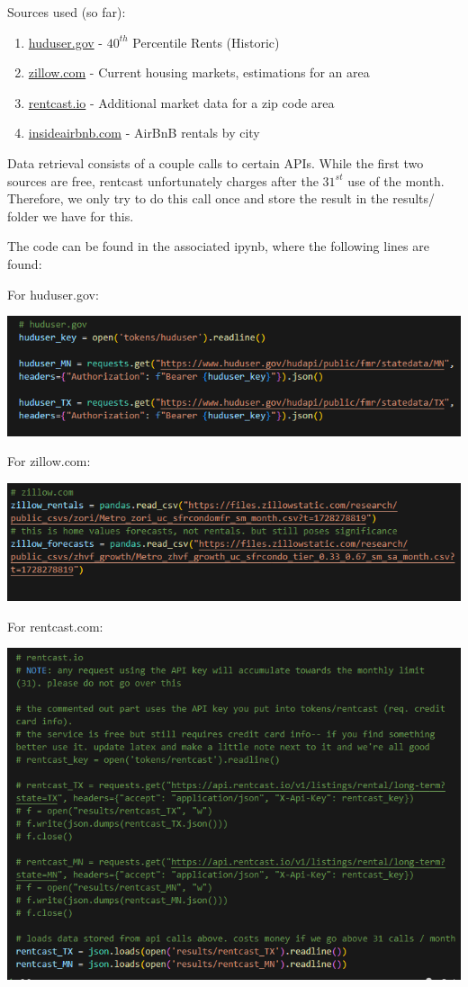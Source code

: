 \documentclass[a4paper]{article}
\begin{document}
\begin{enumerate}
  Sources used (so far):
  \begin{enumerate}
    \item \href{https://www.huduser.gov/portal/datasets/fmr.html#null}{huduser.gov} - $40^{th}$ Percentile Rents (Historic)
    \item \href{https://www.zillow.com/research/data/}{zillow.com} - Current housing markets, estimations for an area
    \item \href{https://www.rentcast.io/api}{rentcast.io} - Additional market data for a zip code area
    \item \href{https://insideairbnb.com/get-the-data/}{insideairbnb.com} - AirBnB rentals by city
  \end{enumerate}

  Data retrieval consists of a couple calls to certain APIs. While the first two sources are free, rentcast unfortunately charges after the $31^{st}$ use of the month. Therefore, we only try to do this call once and store the result in the results/ folder we have for this. 

  The code can be found in the associated ipynb, where the following lines are found: 

  For huduser.gov:

  \includegraphics[scale=0.82]{huduser_retrieval.png}

  For zillow.com:

  \includegraphics[scale=0.82]{zillow_retrieval.png}

  For rentcast.com:

  \includegraphics[scale=0.82]{rentcast_retrieval.png}


\end{enumerate}
\end{document}
